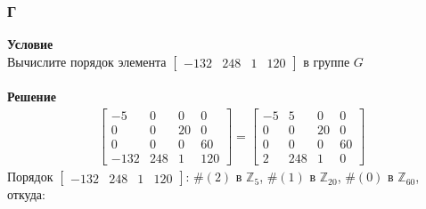 		\subsubsection*{\textbf{Г}}
		\textbf{Условие}\\
		Вычислите порядок элемента $\begin{bmatrix} {-132} & {248} & {1} & {120} \end{bmatrix}$ в группе $G$\\
		\\
		\textbf{Решение}\\
		\begin{gather*}
			\begin{bmatrix}
				{-5} & {0} & {0} & {0} \\
				{0} & {0} & {20} & {0} \\
				{0} & {0} & {0} & {60} \\
				{-132} & {248} & {1} & {120}
			\end{bmatrix}
			=
			\begin{bmatrix}
				{-5} & {5} & {0} & {0} \\
				{0} & {0} & {20} & {0} \\
				{0} & {0} & {0} & {60} \\
				{2} & {248} & {1} & {0}
			\end{bmatrix}
		\end{gather*}
		Порядок $\begin{bmatrix} {-132} & {248} & {1} & {120} \end{bmatrix}$: $\#(2)$ в $\mathbb{Z}_5$, $\#(1)$ в $\mathbb{Z}_{20}$, $\#(0)$ в $\mathbb{Z}_{60}$, откуда: 
		
		
